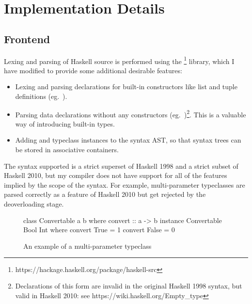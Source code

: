 \documentclass[dissertation.tex]{subfiles}
\begin{document}
\section{Implementation Details}
{
    \subsection{Frontend}
    {

        Lexing and parsing of Haskell source is performed using the
        \footnote{https://hackage.haskell.org/package/haskell-src} library, which I have modified
        to provide some additional desirable features:

        \begin{itemize}
        \item
        {
            Lexing and parsing declarations for built-in constructors like list and tuple definitions (eg.\
            ).
        }
        \item
        {
            Parsing data declarations without any constructors (eg.\ )\footnote{Declarations of this
            form are invalid in the original Haskell 1998 syntax, but valid in Haskell 2010: see
            https://wiki.haskell.org/Empty\_type}. This is a valuable way of introducing built-in types.
        }
        \item
        {
            Adding  and  typeclass instances to the syntax AST, so that syntax trees can
            be stored in associative containers.
        }
        \end{itemize}

        The syntax supported is a strict superset of Haskell 1998 and a strict subset of Haskell 2010, but my compiler
        does not have support for all of the features implied by the scope of the syntax. For example, multi-parameter
        typeclasses are parsed correctly as a feature of Haskell 2010 but get rejected by the deoverloading stage.

        \begin{figure}[h]
            \begin{haskellfigure}
            class Convertable a b where
                convert :: a -> b
            instance Convertable Bool Int where
                convert True = 1
                convert False = 0
            \end{haskellfigure}
            \caption{An example of a multi-parameter typeclass}
        \end{figure}

}}
\end{document}
